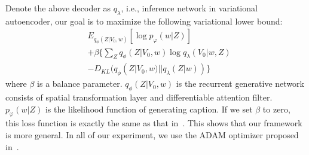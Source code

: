 \documentclass[10pt,twocolumn,letterpaper]{article}
\begin{document}
	Denote the above decoder as $q_\lambda$, i.e., inference network in variational autoencoder, our goal is to maximize the following variational lower bound:
	\begin{equation}
	\begin{aligned}
	&{E_{{q_\phi }(Z|{V_0},w)}}[\log {p_\varphi }(w|Z)]  \\
	&+\beta \{ \sum\nolimits_Z {{q_\phi }(Z|{V_0},w)\log {q_\lambda }(V_0|w,Z)} \\
	&- {D_{KL}}({q_\phi }(Z|{V_0},w)||{q_\lambda }(Z|w))\}
	\end{aligned}
	\end{equation}
	where $\beta$ is a balance parameter. $q_\phi (Z|V_0,w)$ is the recurrent generative network consists of spatial transformation layer and differentiable attention filter. $p_\varphi (w|Z)$ is the likelihood function of generating caption.
	If we set $\beta$ to zero, this loss function is exactly the same as that in~\cite{karpathy2014deep,vinyals2015show,wu2015value,xu2015show}. This shows that our framework is more general. In all of our experiment, we use the ADAM optimizer proposed in~\cite{kingma2014adam}.
	
\end{document}
